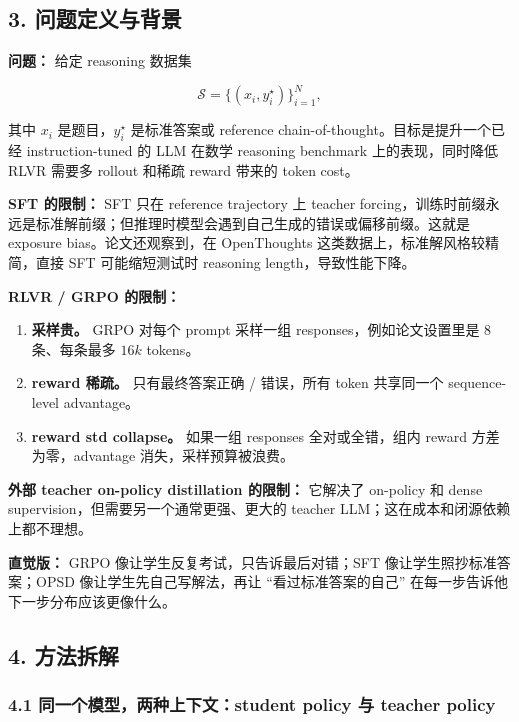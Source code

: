 \subsection{3. 问题定义与背景}

\textbf{问题：} 给定 reasoning 数据集

\[
\mathcal{S}=\{(x_i,y_i^\star)\}_{i=1}^N,
\]

其中 $x_i$ 是题目，$y_i^\star$ 是标准答案或 reference chain-of-thought。目标是提升一个已经 instruction-tuned 的 LLM 在数学 reasoning benchmark 上的表现，同时降低 RLVR 需要多 rollout 和稀疏 reward 带来的 token cost。

\textbf{SFT 的限制：} SFT 只在 reference trajectory 上 teacher forcing，训练时前缀永远是标准解前缀；但推理时模型会遇到自己生成的错误或偏移前缀。这就是 exposure bias。论文还观察到，在 OpenThoughts 这类数据上，标准解风格较精简，直接 SFT 可能缩短测试时 reasoning length，导致性能下降。

\textbf{RLVR / GRPO 的限制：}

\begin{enumerate}[leftmargin=1.5em]
  \item \textbf{采样贵。} GRPO 对每个 prompt 采样一组 responses，例如论文设置里是 $8$ 条、每条最多 $16k$ tokens。
  \item \textbf{reward 稀疏。} 只有最终答案正确 / 错误，所有 token 共享同一个 sequence-level advantage。
  \item \textbf{reward std collapse。} 如果一组 responses 全对或全错，组内 reward 方差为零，advantage 消失，采样预算被浪费。
\end{enumerate}

\textbf{外部 teacher on-policy distillation 的限制：} 它解决了 on-policy 和 dense supervision，但需要另一个通常更强、更大的 teacher LLM；这在成本和闭源依赖上都不理想。

\begin{intubox}
\textbf{直觉版：} GRPO 像让学生反复考试，只告诉最后对错；SFT 像让学生照抄标准答案；OPSD 像让学生先自己写解法，再让 ``看过标准答案的自己'' 在每一步告诉他下一步分布应该更像什么。
\end{intubox}

\subsection{4. 方法拆解}

\subsubsection{4.1 同一个模型，两种上下文：student policy 与 teacher policy}


